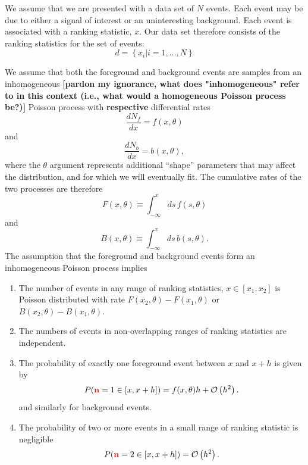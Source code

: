 \documentclass[aps,prd]{revtex4-1}
\newcommand{\order}[1]{\mathcal{O}\left( #1 \right)}
\newcommand{\mathset}[1]{\left\{ #1 \right\}}
\newcommand{\ilya}[1]{{\color{red} \bf #1}}
\begin{document}
We assume that we are presented with a data set of $N$ events.  Each
event may be due to either a signal of interest or an uninteresting
background.  Each event is associated with a ranking statistic, $x$.
Our data set therefore consists of the ranking statistics for the set
of events:
\begin{equation}
  d = \mathset{ x_i | i = 1, \ldots, N }
\end{equation}

We assume that both the foreground and background events are samples
from an inhomogeneous \ilya{[pardon my ignorance, what does "inhomogeneous" refer to in this context (i.e., what would a homogeneous Poisson process be?)]} Poisson process with \ilya{respective} differential rates
\begin{equation}
  \frac{dN_f}{dx} = f(x, \theta)
\end{equation}
and 
\begin{equation}
  \frac{dN_b}{dx} = b(x, \theta),
\end{equation}
where the $\theta$ argument represents additional ``shape'' parameters
that may affect the distribution, and for which we will eventually
fit.  The cumulative rates of the two processes are therefore
\begin{equation}
  F(x,\theta) \equiv \int_{-\infty}^x ds\, f(s, \theta)
\end{equation}
and
\begin{equation}
  B(x,\theta) \equiv \int_{-\infty}^x ds\, b(s,\theta).
\end{equation}
The assumption that the foreground and background events form an
inhomogeneous Poisson process implies
\begin{enumerate}
\item \label{prop:Poisson} The number of events in any range of
  ranking statistics, $x \in [x_1, x_2]$ is Poisson distributed with
  rate $F(x_2, \theta) - F(x_1,\theta)$ or $B(x_2,\theta) -
  B(x_1,\theta)$.
\item The numbers of events in non-overlapping ranges of ranking
  statistics are independent. 
\item The probability of exactly one foreground event between $x$ and
  $x+h$ is given by
  \begin{equation}
    P(\ilya{n} = 1 \in [x, x+h]) = f(x,\theta) h + \order{h^2}.
  \end{equation}
  and similarly for background events.
\item The probability of two or more events in a small range of
  ranking statistic is negligible
  \begin{equation}
    P(\ilya{n} = 2 \in [x, x+h]) = \order{h^2}.
  \end{equation}
\end{enumerate}
\end{document}
